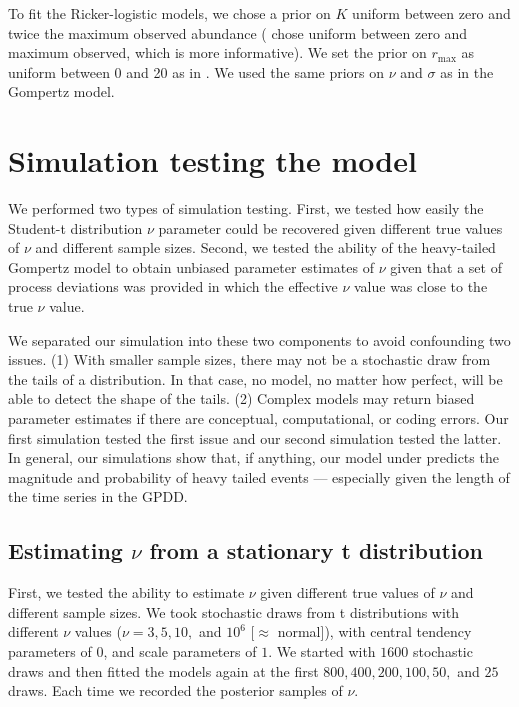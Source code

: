 To fit the Ricker-logistic models, we chose a prior on $K$ uniform between zero
and twice the maximum observed abundance (\citet{clark2010} chose uniform
between zero and maximum observed, which is more informative). We set the prior
on $r_\mathrm{max}$ as uniform between 0 and 20 as in \citet{clark2010}. We used
the same priors on $\nu$ and $\sigma$ as in the Gompertz model.

\section{Simulation testing the model}

We performed two types of simulation testing. First, we tested how easily the
Student-t distribution $\nu$ parameter could be recovered given different true
values of $\nu$ and different sample sizes. Second, we tested the ability of the
heavy-tailed Gompertz model to obtain unbiased parameter estimates of $\nu$
given that a set of process deviations was provided in which the effective
$\nu$ value was close to the true $\nu$ value.

We separated our simulation into these two components to avoid confounding two
issues. (1) With smaller sample sizes, there may not be a stochastic draw from
the tails of a distribution. In that case, no model, no matter how perfect,
will be able to detect the shape of the tails. (2) Complex models may return
biased parameter estimates if there are conceptual, computational, or coding
errors. Our first simulation tested the first issue and our second simulation
tested the latter. In general, our simulations show that, if anything, our
model under predicts the magnitude and probability of heavy tailed events ---
especially given the length of the time series in the GPDD.

\subsection{Estimating $\nu$ from a stationary t distribution}

First, we tested the ability to estimate $\nu$ given different true values of
$\nu$ and different sample sizes. We took stochastic draws from t distributions with
different $\nu$ values ($\nu = 3, 5, 10,$ and $10^6$ [$\approx$ normal]), with
central tendency parameters of $0$, and scale parameters of $1$. We started with
$1600$ stochastic draws and then fitted the models again at the first $800, 400,
200, 100, 50,$ and $25$ draws. Each time we recorded the posterior samples of
$\nu$.

